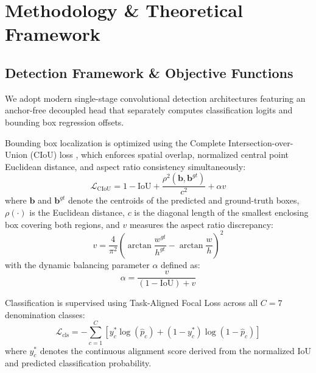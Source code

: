\documentclass[conference]{IEEEtran}
\begin{document}
\section{Methodology \& Theoretical Framework}
\label{sec:methodology}

\subsection{Detection Framework \& Objective Functions}
We adopt modern single-stage convolutional detection architectures featuring an anchor-free decoupled head that separately computes classification logits and bounding box regression offsets.

Bounding box localization is optimized using the Complete Intersection-over-Union (CIoU) loss \cite{zheng2020distance}, which enforces spatial overlap, normalized central point Euclidean distance, and aspect ratio consistency simultaneously:
\begin{equation}
    \mathcal{L}_{\text{CIoU}} = 1 - \text{IoU} + \frac{\rho^2(\mathbf{b}, \mathbf{b}^{gt})}{c^2} + \alpha v
    \label{eq:ciou}
\end{equation}
where $\mathbf{b}$ and $\mathbf{b}^{gt}$ denote the centroids of the predicted and ground-truth boxes, $\rho(\cdot)$ is the Euclidean distance, $c$ is the diagonal length of the smallest enclosing box covering both regions, and $v$ measures the aspect ratio discrepancy:
\begin{equation}
    v = \frac{4}{\pi^2} \left( \arctan \frac{w^{gt}}{h^{gt}} - \arctan \frac{w}{h} \right)^2
\end{equation}
with the dynamic balancing parameter $\alpha$ defined as:
\begin{equation}
    \alpha = \frac{v}{(1 - \text{IoU}) + v}
\end{equation}

Classification is supervised using Task-Aligned Focal Loss \cite{lin2017focal} across all $C = 7$ denomination classes:
\begin{equation}
    \mathcal{L}_{\text{cls}} = - \sum_{c=1}^C \left[ y_c^* \log(\hat{p}_c) + (1 - y_c^*) \log(1 - \hat{p}_c) \right]
\end{equation}
where $y_c^*$ denotes the continuous alignment score derived from the normalized IoU and predicted classification probability.
\end{document}
